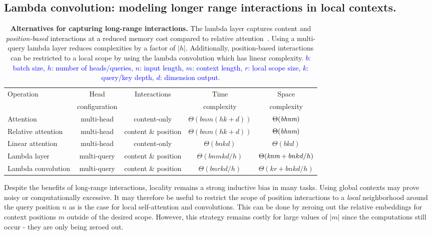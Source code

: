 \documentclass{article} \usepackage{iclr2021_conference,times}
\begin{document}
\subsection{Lambda convolution: modeling longer range interactions in local contexts.}
\begin{table}[h]
  \begin{center}
  \small
  \begin{tabular}{l|cccc}
    \toprule
    \multirow{2}{*}{Operation} & Head & \multirow{2}{*}{Interactions} & Time & Space \\
    & configuration & & complexity & complexity \\
    \midrule
    Attention & multi-head & content-only & $\Theta(bnm(hk+d))$ & $\Theta(\emph{bhnm})$ \\
    Relative attention & multi-head & content \& position & $\Theta(bnm(hk+d))$ & $\Theta(\emph{bhnm})$ \\
    Linear attention & multi-head & content-only & $\Theta(bnkd)$ & $\Theta(bkd)$ \\
    \midrule
    Lambda layer & multi-query & content \& position & $\Theta(bnmkd/h)$ & $\Theta(\emph{knm} + bnkd/h)$ \\
    Lambda convolution & multi-query & content \& position & $\Theta(bnrkd/h)$ & $\Theta(kr + bnkd/h)$ \\
    \bottomrule
  \end{tabular}
  \caption{
  \textbf{Alternatives for capturing long-range interactions.}
  The lambda layer captures content and \emph{position-based} interactions at a reduced memory cost compared to relative attention~\citep{shaw2018relative,bello2019aacn}.
  Using a multi-query lambda layer reduces complexities by a factor of $|h|$.
  Additionally, position-based interactions can be restricted to a local scope by using the lambda convolution which has linear complexity.
  \textcolor{blue}{$b$: batch size, $h$: number of heads/queries, $n$: input length, $m$: context length, $r$: local scope size, $k$: query/key depth, $d$: dimension output.}
  }
  \label{tab:interactions_alternatives}
  \vspace{-0.2cm}
  \end{center}
\end{table}

Despite the benefits of long-range interactions, locality remains a strong inductive bias in many tasks.
Using global contexts may prove noisy or computationally excessive.
It may therefore be useful to restrict the scope of position interactions to a \emph{local} neighborhood around the query position $n$ as is the case for local self-attention and convolutions.
This can be done by zeroing out the relative embeddings for context positions $m$ outside of the desired scope.
However, this strategy remains costly for large values of $|m|$ since the computations still occur - they are only being zeroed out.
\end{document}
